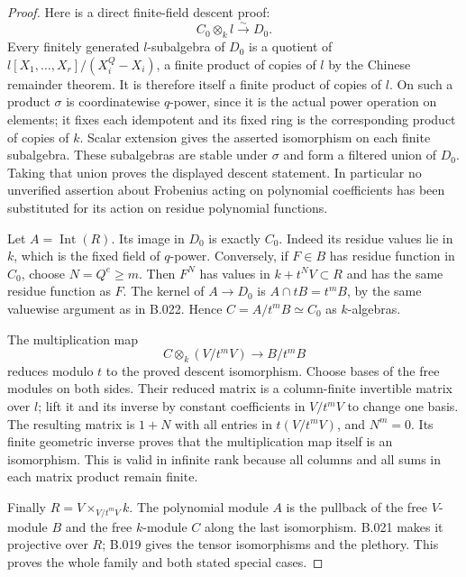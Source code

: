 \begin{proof}
Here is a direct finite-field descent proof:
\[
 C_0\otimes_k l\xrightarrow{\sim}D_0.
\]
Every finitely generated $l$-subalgebra of $D_0$ is a quotient of
$l[X_1,\ldots,X_r]/(X_i^Q-X_i)$, a finite product of copies of
$l$ by the Chinese remainder theorem. It is therefore itself a
finite product of copies of $l$. On such a product $\sigma$ is
coordinatewise $q$-power, since it is the actual power operation
on elements; it fixes each idempotent and its fixed ring is the
corresponding product of copies of $k$. Scalar extension gives
the asserted isomorphism on each finite subalgebra. These
subalgebras are stable under $\sigma$ and form a filtered union
of $D_0$. Taking that union proves the displayed descent statement.
In particular no unverified assertion about Frobenius acting on
polynomial coefficients has been substituted for its action on
residue polynomial functions.

Let $A=\operatorname{Int}(R)$. Its image in $D_0$ is exactly
$C_0$. Indeed its residue values lie in $k$, which is the fixed
field of $q$-power. Conversely, if $F\in B$ has residue function
in $C_0$, choose $N=Q^e\ge m$. Then $F^N$ has values in
$k+t^NV\subset R$ and has the same residue function as $F$.
The kernel of $A\to D_0$ is $A\cap tB=t^mB$, by the same
valuewise argument as in B.022. Hence
$C=A/t^mB\simeq C_0$ as $k$-algebras.

The multiplication map
\[
 C\otimes_k(V/t^mV)\longrightarrow B/t^mB
\]
reduces modulo $t$ to the proved descent isomorphism.
Choose bases of the free modules on both sides. Their reduced
matrix is a column-finite invertible matrix over $l$; lift it
and its inverse by constant coefficients in $V/t^mV$ to change
one basis. The resulting matrix is $1+N$ with all entries in
$t(V/t^mV)$, and $N^m=0$. Its finite geometric inverse proves
that the multiplication map itself is an isomorphism. This is
valid in infinite rank because all columns and all sums in each
matrix product remain finite.

Finally $R=V\times_{V/t^mV}k$. The polynomial module $A$ is the
pullback of the free $V$-module $B$ and the free $k$-module $C$
along the last isomorphism. B.021 makes it projective over $R$;
B.019 gives the tensor isomorphisms and the plethory. This proves
the whole family and both stated special cases.
\end{proof}

